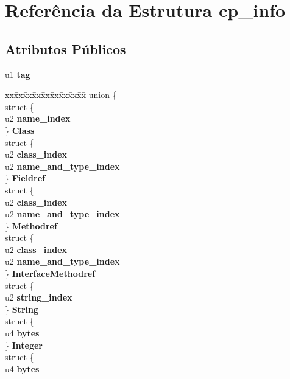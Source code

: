 \hypertarget{structcp__info}{}\section{Referência da Estrutura cp\+\_\+info}
\label{structcp__info}
\subsection*{Atributos Públicos}
\begin{DoxyCompactItemize}
\item 
\mbox{\label{structcp__info_a045b8801a6e96a2a31d3b62ea684f141}} 
u1 {\bfseries tag}
\item 
\mbox{\label{structcp__info_aad04019f28f2b6191ace6ab762e051a5}} 
\begin{tabbing}
xx\=xx\=xx\=xx\=xx\=xx\=xx\=xx\=xx\=\kill
union \{\\
\>struct \{\\
\>\>u2 {\bfseries name\_index}\\
\>\} {\bfseries Class}\\
\>struct \{\\
\>\>u2 {\bfseries class\_index}\\
\>\>u2 {\bfseries name\_and\_type\_index}\\
\>\} {\bfseries Fieldref}\\
\>struct \{\\
\>\>u2 {\bfseries class\_index}\\
\>\>u2 {\bfseries name\_and\_type\_index}\\
\>\} {\bfseries Methodref}\\
\>struct \{\\
\>\>u2 {\bfseries class\_index}\\
\>\>u2 {\bfseries name\_and\_type\_index}\\
\>\} {\bfseries InterfaceMethodref}\\
\>struct \{\\
\>\>u2 {\bfseries string\_index}\\
\>\} {\bfseries String}\\
\>struct \{\\
\>\>u4 {\bfseries bytes}\\
\>\} {\bfseries Integer}\\
\>struct \{\\
\>\>u4 {\bfseries bytes}\\

\end{tabbing}
\end{DoxyCompactItemize}
